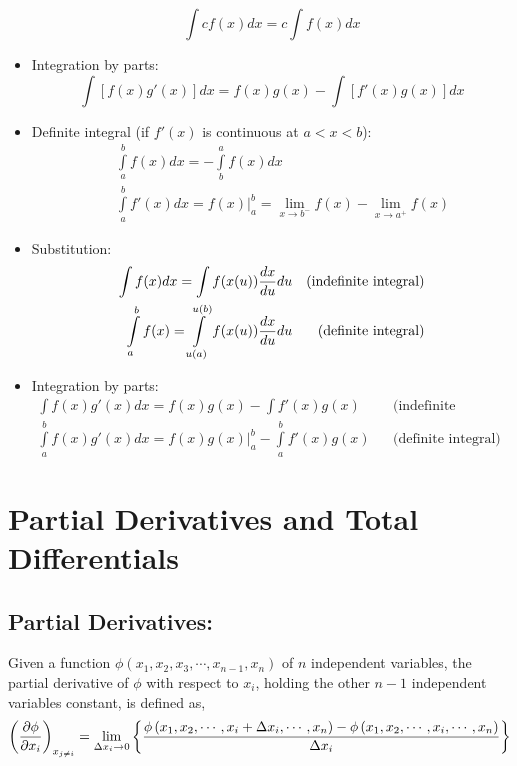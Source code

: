\begin{itemize}
    \begin{displaymath}
       \int c f(x)dx = c\int f(x)dx
    \end{displaymath}
%
  \item Integration by parts:
    \begin{displaymath}
       \int\left[f(x)g'(x)\right]dx = f(x)g(x) - \int\left[f'(x)g(x)\right]dx
    \end{displaymath}
%
  \item Definite integral (if $f'(x)$ is continuous at $a<x<b$):
    \begin{eqnarray}
       && \int\limits_{a}^{b}f(x)dx = - \int\limits_{b}^{a}f(x)dx \nonumber \\
       && \int\limits_{a}^{b}f'(x)dx = \left.f(x)\right|_{a}^{b} = \lim_{x\rightarrow b^{-}}f(x)-\lim_{x\rightarrow a^{+}}f(x)\nonumber
    \end{eqnarray}
%
  \item Substitution:
    \begin{eqnarray}
        \int f(x)dx = \int f(x(u))\displaystyle\frac{dx}{du}du && \text{(indefinite integral)} \nonumber \\
        \int\limits_{a}^{b} f(x) = \int\limits_{u(a)}^{u(b)}f(x(u))\displaystyle\frac{dx}{du}du  && \text{(definite integral)} \nonumber
    \end{eqnarray}
%
  \item Integration by parts:
    \begin{eqnarray}
       \int f(x)g'(x)dx = f(x)g(x) - \int f'(x)g(x) && \text{(indefinite integral)} \nonumber \\
       \int\limits_{a}^{b} f(x)g'(x)dx = \left.f(x)g(x)\right|_{a}^{b} - \int\limits_{a}^{b} f'(x)g(x) && \text{(definite integral)} \nonumber        
    \end{eqnarray}
%
\end{itemize}


\section{Partial Derivatives and Total Differentials}

\subsection{Partial Derivatives:}\label{Appendix_Calculus:PartialDifferential}  Given a function $\phi\left(x_{1},x_{2},x_{3},\cdots,x_{n-1},x_{n}\right)$ of $n$ independent variables, the partial derivative of $\phi$ with respect to $x_{i}$, holding the other $n-1$ independent variables constant, is defined as,
  \begin{displaymath}
    \left(\displaystyle\frac{\partial\phi}{\partial x_{i}}\right)_{x_{j\neq i}} = \lim_{\Delta x_{i}\rightarrow 0}\left\{\displaystyle\frac{\phi\left(x_{1},x_{2},\cdots,x_{i}+\Delta x_{i},\cdots,x_{n}\right)-\phi\left(x_{1},x_{2},\cdots,x_{i},\cdots,x_{n}\right)}{\Delta x_{i}}\right\}
  \end{displaymath}


